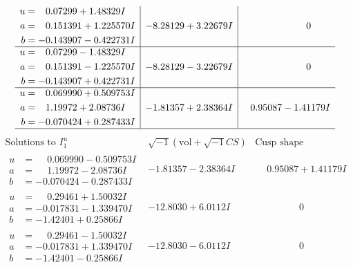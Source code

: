 \documentclass[1p]{elsarticle_modified}
\theoremstyle{definition}
\newcommand{\I}{\sqrt{-1}}
\begin{document}
$$\begin{array}{c|c|c}
\begin{aligned}
u &= \phantom{-}0.07299 + 1.48329 I \\
a &= \phantom{-}0.151391 + 1.225570 I \\
b &= -0.143907 - 0.422731 I\end{aligned}
 & -8.28129 + 3.22679 I & \phantom{-0.000000 } 0 \\ \hline\begin{aligned}
u &= \phantom{-}0.07299 - 1.48329 I \\
a &= \phantom{-}0.151391 - 1.225570 I \\
b &= -0.143907 + 0.422731 I\end{aligned}
 & -8.28129 - 3.22679 I & \phantom{-0.000000 } 0 \\ \hline\begin{aligned}
u &= \phantom{-}0.069990 + 0.509753 I \\
a &= \phantom{-}1.19972 + 2.08736 I \\
b &= -0.070424 + 0.287433 I\end{aligned}
 & -1.81357 + 2.38364 I & \phantom{-}0.95087 - 1.41179 I\\
 \hline 
 \end{array}$$\newpage$$\begin{array}{c|c|c}  
\text{Solutions to }I^u_{1}& \I (\text{vol} + \sqrt{-1}CS) & \text{Cusp shape}\\
 \hline 
\begin{aligned}
u &= \phantom{-}0.069990 - 0.509753 I \\
a &= \phantom{-}1.19972 - 2.08736 I \\
b &= -0.070424 - 0.287433 I\end{aligned}
 & -1.81357 - 2.38364 I & \phantom{-}0.95087 + 1.41179 I \\ \hline\begin{aligned}
u &= \phantom{-}0.29461 + 1.50032 I \\
a &= -0.017831 - 1.339470 I \\
b &= -1.42401 + 0.25866 I\end{aligned}
 & -12.8030 + 6.0112 I & \phantom{-0.000000 } 0 \\ \hline\begin{aligned}
u &= \phantom{-}0.29461 - 1.50032 I \\
a &= -0.017831 + 1.339470 I \\
b &= -1.42401 - 0.25866 I\end{aligned}
 & -12.8030 - 6.0112 I & \phantom{-0.000000 } 0 \\ \hline\begin{aligned}

\end{aligned}
\end{array}$$
\end{document}
